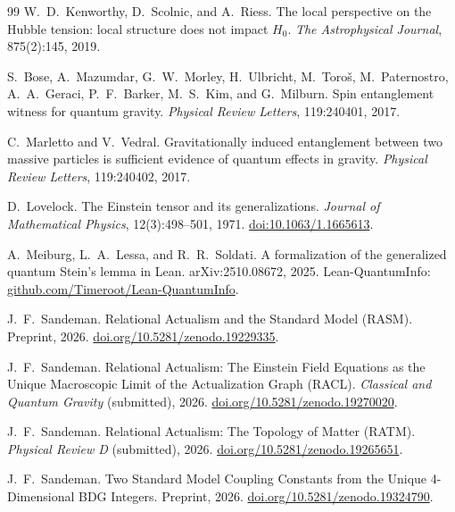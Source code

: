 \documentclass[11pt,a4paper]{article}
\theoremstyle{plain}
\theoremstyle{definition}
\theoremstyle{remark}
\begin{document}
\begin{thebibliography}{99}
W.~D.~Kenworthy, D.~Scolnic, and A.~Riess.
\newblock The local perspective on the {Hubble} tension: local structure does
  not impact $H_0$.
\newblock \textit{The Astrophysical Journal}, 875(2):145, 2019.

S.~Bose, A.~Mazumdar, G.~W.~Morley, H.~Ulbricht, M.~Toro\v{s},
  M.~Paternostro, A.~A.~Geraci, P.~F.~Barker, M.~S.~Kim, and G.~Milburn.
\newblock Spin entanglement witness for quantum gravity.
\newblock \textit{Physical Review Letters}, 119:240401, 2017.

C.~Marletto and V.~Vedral.
\newblock Gravitationally induced entanglement between two massive particles is
  sufficient evidence of quantum effects in gravity.
\newblock \textit{Physical Review Letters}, 119:240402, 2017.


D.~Lovelock.
\newblock The Einstein tensor and its generalizations.
\newblock \emph{Journal of Mathematical Physics}, 12(3):498--501, 1971.
\newblock \href{https://doi.org/10.1063/1.1665613}{doi:10.1063/1.1665613}.

A.~Meiburg, L.~A.~Lessa, and R.~R.~Soldati.
\newblock A formalization of the generalized quantum {Stein's} lemma in {Lean}.
\newblock arXiv:2510.08672, 2025.
\newblock Lean-QuantumInfo:
  \href{https://github.com/Timeroot/Lean-QuantumInfo}{github.com/Timeroot/Lean-QuantumInfo}.

J.~F.~Sandeman.
\newblock Relational Actualism and the Standard Model ({RASM}).
\newblock Preprint, 2026.
\newblock \href{https://doi.org/10.5281/zenodo.19229335}{doi.org/10.5281/zenodo.19229335}.

J.~F.~Sandeman.
\newblock Relational Actualism: The Einstein Field Equations as the Unique
  Macroscopic Limit of the Actualization Graph ({RACL}).
\newblock \textit{Classical and Quantum Gravity} (submitted), 2026.
\newblock \href{https://doi.org/10.5281/zenodo.19270020}{doi.org/10.5281/zenodo.19270020}.

J.~F.~Sandeman.
\newblock Relational Actualism: The Topology of Matter ({RATM}).
\newblock \textit{Physical Review D} (submitted), 2026.
\newblock \href{https://doi.org/10.5281/zenodo.19265651}{doi.org/10.5281/zenodo.19265651}.

J.~F.~Sandeman.
\newblock Two Standard Model Coupling Constants from the Unique 4-Dimensional
  BDG Integers.
\newblock Preprint, 2026.
\newblock \href{https://doi.org/10.5281/zenodo.19324790}{doi.org/10.5281/zenodo.19324790}.


\end{thebibliography}
\end{document}
